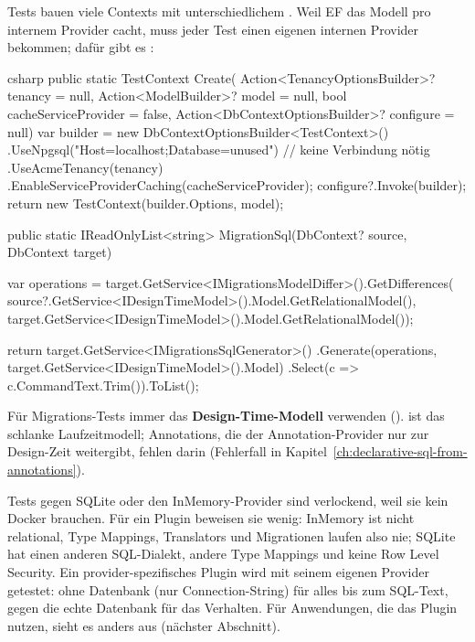 Tests bauen viele Contexts mit unterschiedlichem
. Weil EF das Modell pro internem Provider
cacht, muss jeder Test einen eigenen internen Provider bekommen; dafür gibt es
:

\begin{sourcecode}{csharp}
public static TestContext Create(
    Action<TenancyOptionsBuilder>? tenancy = null,
    Action<ModelBuilder>? model = null,
    bool cacheServiceProvider = false,
    Action<DbContextOptionsBuilder>? configure = null)
{
    var builder = new DbContextOptionsBuilder<TestContext>()
        .UseNpgsql("Host=localhost;Database=unused")       // keine Verbindung nötig
        .UseAcmeTenancy(tenancy)
        .EnableServiceProviderCaching(cacheServiceProvider);
    configure?.Invoke(builder);
    return new TestContext(builder.Options, model);
}

public static IReadOnlyList<string> MigrationSql(DbContext? source, DbContext target)
{
    var operations = target.GetService<IMigrationsModelDiffer>().GetDifferences(
        source?.GetService<IDesignTimeModel>().Model.GetRelationalModel(),
        target.GetService<IDesignTimeModel>().Model.GetRelationalModel());

    return target.GetService<IMigrationsSqlGenerator>()
        .Generate(operations, target.GetService<IDesignTimeModel>().Model)
        .Select(c => c.CommandText.Trim()).ToList();
}
\end{sourcecode}

\begin{important}
  Für Migrations-Tests immer das \textbf{Design-Time-Modell} verwenden
  ().  ist
  das schlanke Laufzeitmodell; Annotations, die der Annotation-Provider nur zur Design-Zeit
  weitergibt, fehlen darin (Fehlerfall in
  Kapitel~\ref{ch:declarative-sql-from-annotations}).
\end{important}

\begin{note}
  Tests gegen SQLite oder den InMemory-Provider sind verlockend, weil sie kein Docker
  brauchen. Für ein Plugin beweisen sie wenig: InMemory ist nicht relational, Type Mappings,
  Translators und Migrationen laufen also nie; SQLite hat einen anderen SQL-Dialekt, andere
  Type Mappings und keine Row Level Security. Ein provider-spezifisches Plugin wird mit
  seinem eigenen Provider getestet: ohne Datenbank (nur Connection-String) für alles bis zum
  SQL-Text, gegen die echte Datenbank für das Verhalten. Für Anwendungen, die das Plugin
  nutzen, sieht es anders aus (nächster Abschnitt).
\end{note}

